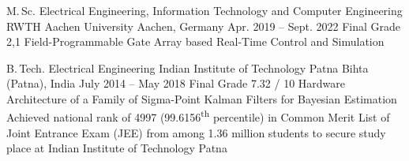 
\begin{cveducation}

\cvschool
	{M.\,Sc.} %
	{Electrical Engineering, Information Technology and Computer Engineering} %
	{RWTH Aachen University} %
	{Aachen, Germany\acvHeaderIconSep{}} %
	{Apr. 2019 -- Sept. 2022} %
	{Final Grade 2,1} %
	{Field-Programmable Gate Array based Real-Time Control and Simulation} %
	{}

\cvschool
	{B.\,Tech.} %
	{Electrical Engineering} %
	{Indian Institute of Technology Patna} %
	{Bihta (Patna), India\acvHeaderIconSep{}} %
	{July 2014 -- May 2018} %
	{Final Grade 7.32 / 10} %
	{Hardware Architecture of a Family of Sigma-Point Kalman Filters for Bayesian Estimation} %
	{Achieved national rank of 4997 (99.6156\textsuperscript{th} percentile) in Common Merit List of Joint Entrance Exam (JEE) from among 1.36 million students to secure study place at Indian Institute of Technology Patna} %



\end{cveducation}
